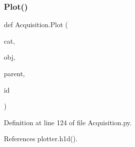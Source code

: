 \subsubsection{\texorpdfstring{Plot()}{Plot()}}
{\footnotesize\ttfamily def Acquisition.\+Plot (\begin{DoxyParamCaption}\item[{}]{cat,  }\item[{}]{obj,  }\item[{}]{parent,  }\item[{}]{id }\end{DoxyParamCaption})}



Definition at line 124 of file Acquisition.\+py.



References plotter.\+h1d().


